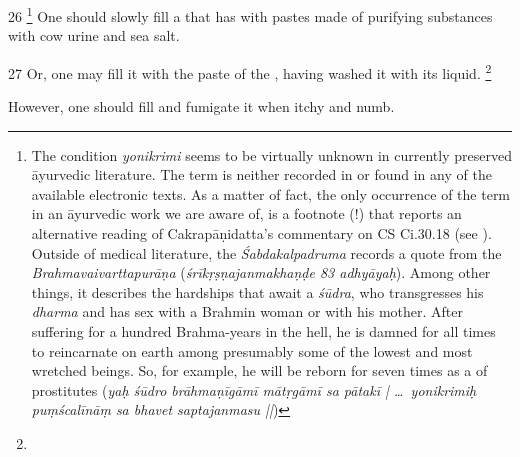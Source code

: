 \begin{translation}
\item [26]
	\footnote{%
    The condition \textit{yonikrimi} seems to be virtually unknown in currently 
    preserved  āyurvedic literature. The term is neither recorded in 
    \textcite{josi-maha} or found in any of the available electronic texts. As a matter 
    of fact, the only occurrence of the term in an āyurvedic work we are aware of, is a 
    footnote (!) that reports an alternative reading of Cakrapāṇidatta's commentary 
    on CS Ci.30.18 (see \textcite[635b]{cara-trikamji3}).
    Outside of medical literature, the \textit{Śabdakalpadruma} records a quote from 
    the \textit{Brahmavaivarttapurāṇa} (\textit{śrīkṛṣṇajanmakhaṇḍe 83 adhyāyaḥ}). 
    Among other things, it describes the hardships that await a \textit{śūdra}, who 
    transgresses his \textit{dharma} and has sex with a Brahmin woman or with his 
    mother. After suffering for a hundred Brahma-years in the hell, he is damned for 
    all times to reincarnate on earth among presumably some of the lowest and most 
    wretched beings. So, for example, he will be reborn for seven times as a 
     of prostitutes (\textit{yaḥ śūdro brāhmaṇīgāmī 
    mātṛgāmī sa pātakī | \ldots\ yonikrimiḥ puṃścalīnāṃ sa bhavet saptajanmasu 
    ||})     
    } 
One should slowly fill a  that has  with pastes made of purifying substances with cow urine and sea salt.

\item [27]
Or, one may fill it with the paste of the , having washed it with its liquid.%
    \footnote{%
    } 

However, one should fill and fumigate it when itchy and numb.%

%
%



\end{translation}
